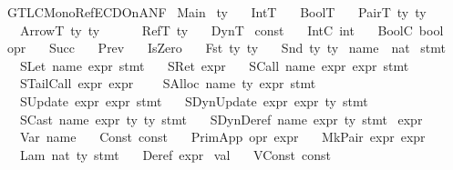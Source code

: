 \begin{isabellebody}\def\isabellecontext{GTLC{\isacharunderscore}MonoRef{\isacharunderscore}ECDOnANF}\isadelimtheory
\endisadelimtheory
\isatagtheory
{}\isamarkupfalse \ GTLC{\isacharunderscore}MonoRef{\isacharunderscore}ECDOnANF\isanewline
{}\ Main\isanewline
{}\endisatagtheory
{\isafoldtheory}\isadelimtheory
\endisadelimtheory
{}
\isamarkuptrue {}\isamarkupfalse \ ty\isanewline
\ \ {\isacharequal}\ IntT\isanewline
\ \ {\isacharbar}\ BoolT\isanewline
\ \ {\isacharbar}\ PairT\ ty\ ty\ {\isacharparenleft}\ {\isachardoublequoteopen}{\isasymtimes}{\isachardoublequoteclose}\ {}{}{}{\isacharparenright}\isanewline
\ \ {\isacharbar}\ ArrowT\ ty\ ty\ {\isacharparenleft}\ {\isachardoublequoteopen}{\isasymrightarrow}{\isachardoublequoteclose}\ {}{}{}{\isacharparenright}\isanewline
\ \ {\isacharbar}\ RefT\ ty\isanewline
\ \ {\isacharbar}\ DynT\isanewline
\isanewline
{}\isamarkupfalse \ const\isanewline
\ \ {\isacharequal}\ IntC\ int\isanewline
\ \ {\isacharbar}\ BoolC\ bool\isanewline
\isanewline
{}\isamarkupfalse \ opr\isanewline
\ \ {\isacharequal}\ Succ\isanewline
\ \ {\isacharbar}\ Prev\isanewline
\ \ {\isacharbar}\ IsZero\isanewline
\ \ {\isacharbar}\ Fst\ ty\ ty\isanewline
\ \ {\isacharbar}\ Snd\ ty\ ty\isanewline
\isanewline
{}\isamarkupfalse \ name\ {\isacharequal}\ nat\isanewline
\isanewline
{}\isamarkupfalse \ stmt\isanewline
\ \ {\isacharequal}\ SLet\ name\ expr\ stmt\isanewline
\ \ {\isacharbar}\ SRet\ expr\isanewline
\ \ {\isacharbar}\ SCall\ name\ expr\ expr\ stmt\isanewline
\ \ {\isacharbar}\ STailCall\ expr\ expr\ \isanewline
\ \ {\isacharbar}\ SAlloc\ name\ ty\ expr\ stmt\isanewline
\ \ {\isacharbar}\ SUpdate\ expr\ expr\ stmt\isanewline
\ \ {\isacharbar}\ SDynUpdate\ expr\ expr\ ty\ stmt\isanewline
\ \ {\isacharbar}\ SCast\ name\ expr\ ty\ ty\ stmt\isanewline
\ \ {\isacharbar}\ SDynDeref\ name\ expr\ ty\ stmt\isanewline
\isanewline
{}\ expr\ \isanewline
\ \ {\isacharequal}\ Var\ name\isanewline
\ \ {\isacharbar}\ Const\ const\isanewline
\ \ {\isacharbar}\ PrimApp\ opr\ expr\isanewline
\ \ {\isacharbar}\ MkPair\ expr\ expr\isanewline
\ \ {\isacharbar}\ Lam\ nat\ ty\ stmt\isanewline
\ \ {\isacharbar}\ Deref\ expr\isanewline
\isanewline
{}\isamarkupfalse \ val\isanewline
\ \ {\isacharequal}\ VConst\ const\isanewline

\end{isabellebody}
